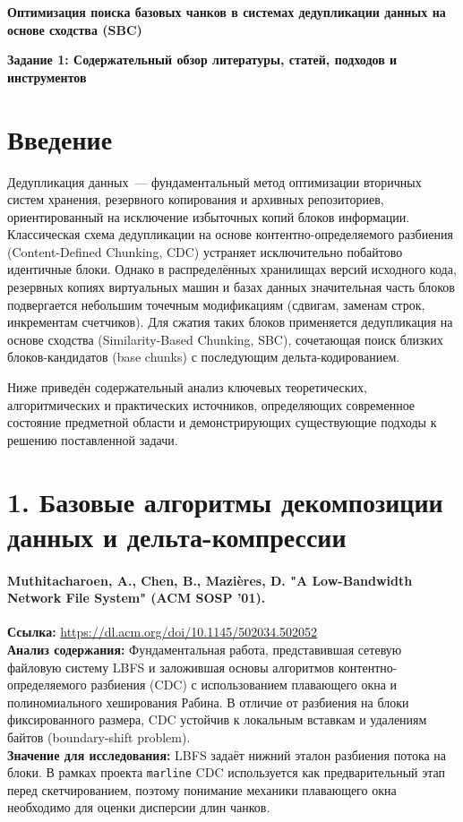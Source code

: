 \documentclass[a4paper,14pt]{extarticle}
\begin{document}
\begin{center}
    \textbf{\Large Оптимизация поиска базовых чанков в системах дедупликации данных на основе сходства (SBC)}
    
    \vspace{0.5em}
    \textbf{\large Задание 1: Содержательный обзор литературы, статей, подходов и инструментов}
\end{center}

\vspace{1em}

\section*{Введение}

Дедупликация данных~--- фундаментальный метод оптимизации вторичных систем хранения, резервного копирования и архивных репозиториев, ориентированный на исключение избыточных копий блоков информации. Классическая схема дедупликации на основе контентно-определяемого разбиения (Content-Defined Chunking, CDC) устраняет исключительно побайтово идентичные блоки. Однако в распределённых хранилищах версий исходного кода, резервных копиях виртуальных машин и базах данных значительная часть блоков подвергается небольшим точечным модификациям (сдвигам, заменам строк, инкрементам счетчиков). Для сжатия таких блоков применяется дедупликация на основе сходства (Similarity-Based Chunking, SBC), сочетающая поиск близких блоков-кандидатов (base chunks) с последующим дельта-кодированием. 

Ниже приведён содержательный анализ ключевых теоретических, алгоритмических и практических источников, определяющих современное состояние предметной области и демонстрирующих существующие подходы к решению поставленной задачи.

\section*{1. Базовые алгоритмы декомпозиции данных и дельта-компрессии}

\paragraph{Muthitacharoen, A., Chen, B., Mazières, D. "A Low-Bandwidth Network File System" (ACM SOSP '01).}
\textbf{Ссылка:} \url{https://dl.acm.org/doi/10.1145/502034.502052} \\
\textbf{Анализ содержания:} Фундаментальная работа, представившая сетевую файловую систему LBFS и заложившая основы алгоритмов контентно-определяемого разбиения (CDC) с использованием плавающего окна и полиномиального хеширования Рабина. В отличие от разбиения на блоки фиксированного размера, CDC устойчив к локальным вставкам и удалениям байтов (boundary-shift problem). \\
\textbf{Значение для исследования:} LBFS задаёт нижний эталон разбиения потока на блоки. В рамках проекта \texttt{marline} CDC используется как предварительный этап перед скетчированием, поэтому понимание механики плавающего окна необходимо для оценки дисперсии длин чанков.
\end{document}
